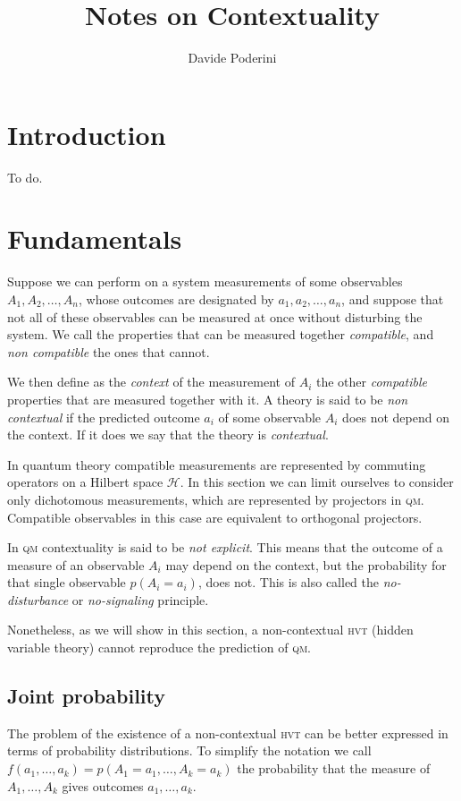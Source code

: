 \documentclass[a4paper]{article}
\newcommand{\Hil}{\mathcal{H}}
\newcommand{\acron}[1]{\textsc{#1}}
\newcommand{\HVT}{\acron{hvt}}
\newcommand{\QM}{\acron{qm}}
\theoremstyle{definition}
\begin{document}
\title{Notes on Contextuality}
\author{Davide Poderini}
\date{}
\maketitle

\section{Introduction}
To do.
\section{Fundamentals}
Suppose we can perform on a system measurements of some observables $A_1, A_2,\ldots, A_n$,
whose outcomes are designated by $a_1, a_2, \ldots, a_n$, and suppose that not all of these
observables can be measured at once without disturbing the system.
We call the properties that can be measured together \emph{compatible}, and
\emph{non compatible} the ones that cannot.

We then define as the \emph{context} of the measurement of $A_i$ the other
\emph{compatible} properties that are measured together with it.
A theory is said to be \emph{non contextual} if the predicted outcome $a_i$ of some observable
$A_i$ does not depend on the context.
If it does we say that the theory is \emph{contextual}.

In quantum theory compatible measurements are represented by commuting operators
on a Hilbert space $\Hil$. 
In this section we can limit ourselves to consider only dichotomous
measurements, which are represented by projectors in \QM{}.
Compatible observables in this case are equivalent to orthogonal projectors.

In \QM{} contextuality is said to be \emph{not explicit}. This means that the outcome of a measure of an
observable $A_i$ may depend on the context, but the probability for that single
observable $p(A_i = a_i)$, does not.
This is also called the \emph{no-disturbance} or \emph{no-signaling} principle.

Nonetheless, as we will show in this section, a non-contextual \HVT{} (hidden
variable theory) cannot reproduce the prediction of \QM{}.

\subsection{Joint probability}
\label{sec:joint_prob}
The problem of the existence of a non-contextual \HVT{} can be better
expressed in terms of probability distributions.
To simplify the notation we call $f(a_1,\ldots,a_k) = p(A_1=a_1, \ldots,
A_k=a_k)$ the probability that the measure of $A_1,\ldots,A_k$ gives outcomes
$a_1,\ldots,a_k$.
\end{document}
